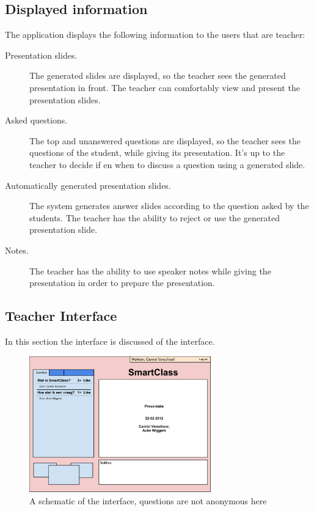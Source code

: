 \documentclass[11pt]{article}
\begin{document}
\subsection{Displayed information}
The application displays the following information to the users that are teacher:
\begin{description}
\item[Presentation slides.] The generated slides are displayed, so the teacher sees the generated presentation in front. The teacher can comfortably view and present the presentation slides.
\item[Asked questions.] The top and unanswered questions are displayed, so the teacher sees the questions of the student, while giving its presentation. It's up to the teacher to decide if en when to discuss a question using a generated slide. 
\item[Automatically generated presentation slides.] The system generates answer slides according to the question asked by the students. The teacher has the ability to reject or use the generated presentation slide.
\item[Notes.] The teacher has the ability to use speaker notes while giving the presentation in order to prepare the presentation.
\end{description}

\subsection{Teacher Interface}
In this section the interface is discussed of the interface.
\begin{figure}[!h]
\centering
\includegraphics[width=0.7\textwidth]{KBMSInterface.png}
\caption{A schematic of the interface, questions are not anonymous here}
\end{figure}
\end{document}
